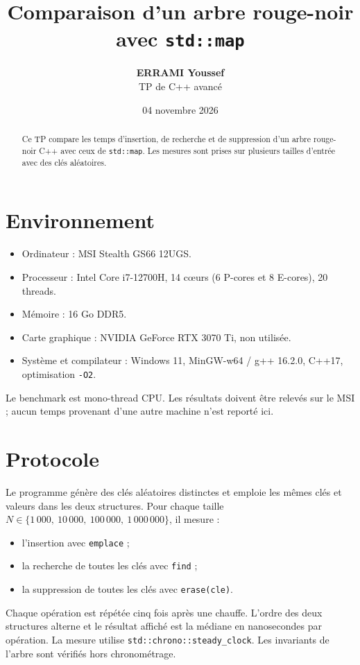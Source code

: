 \documentclass[11pt,a4paper]{article}
\title{\textbf{Comparaison d'un arbre rouge-noir avec \texttt{std::map}}}
\author{\textbf{ERRAMI Youssef}\\TP de C++ avancé}
\date{04 novembre 2026}
\begin{document}
{\color{bleuTP}\maketitle}

\begin{abstract}
Ce TP compare les temps d'insertion, de recherche et de suppression d'un
arbre rouge-noir C++ avec ceux de \texttt{std::map}. Les mesures sont prises
sur plusieurs tailles d'entrée avec des clés aléatoires.
\end{abstract}

\section{\textcolor{bleuTP}{Environnement}}
\begin{itemize}
  \item Ordinateur : MSI Stealth GS66 12UGS.
  \item Processeur : Intel Core i7-12700H, 14 cœurs (6 P-cores et 8 E-cores),
        20 threads.
  \item Mémoire : 16 Go DDR5.
  \item Carte graphique : NVIDIA GeForce RTX 3070 Ti, non utilisée.
  \item Système et compilateur : Windows 11, MinGW-w64 / g++ 16.2.0,
        C++17, optimisation \texttt{-O2}.
\end{itemize}
Le benchmark est mono-thread CPU. Les résultats doivent être relevés sur le
MSI ; aucun temps provenant d'une autre machine n'est reporté ici.

\section{\textcolor{bleuTP}{Protocole}}
Le programme génère des clés aléatoires distinctes et emploie les mêmes clés
et valeurs dans les deux structures. Pour chaque taille
$N \in \{1\,000,\ 10\,000,\ 100\,000,\ 1\,000\,000\}$, il mesure :
\begin{itemize}
  \item l'insertion avec \texttt{emplace} ;
  \item la recherche de toutes les clés avec \texttt{find} ;
  \item la suppression de toutes les clés avec \texttt{erase(cle)}.
\end{itemize}
Chaque opération est répétée cinq fois après une chauffe. L'ordre des deux
structures alterne et le résultat affiché est la médiane en nanosecondes par
opération. La mesure utilise \texttt{std::chrono::steady\_clock}. Les
invariants de l'arbre sont vérifiés hors chronométrage.
\end{document}
